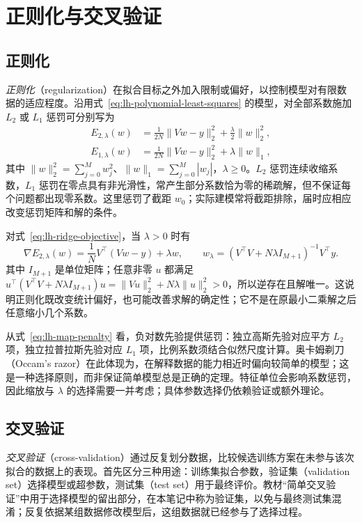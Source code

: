 \section{正则化与交叉验证}
\label{sec:lh-regularization-cv}

\subsection{正则化}
\label{subsec:lh-regularization}

\emph{正则化}（regularization）在拟合目标之外加入限制或偏好，以控制模型对有限数据的适应程度。沿用式~\eqref{eq:lh-polynomial-least-squares} 的模型，对全部系数施加 $L_2$ 或 $L_1$ 惩罚可分别写为
\begin{align}
    E_{2,\lambda}(w)
      &=\frac1{2N}\|Vw-y\|_2^2+\frac\lambda2\|w\|_2^2,
      \label{eq:lh-ridge-objective}\\
    E_{1,\lambda}(w)
      &=\frac1{2N}\|Vw-y\|_2^2+\lambda\|w\|_1,
      \label{eq:lh-lasso-objective}
\end{align}
其中 $\|w\|_2^2=\sum_{j=0}^M w_j^2$、$\|w\|_1=\sum_{j=0}^M|w_j|$，$\lambda\geq0$。$L_2$ 惩罚连续收缩系数，$L_1$ 惩罚在零点具有非光滑性，常产生部分系数恰为零的稀疏解，但不保证每个问题都出现零系数。这里惩罚了截距 $w_0$；实际建模常将截距排除，届时应相应改变惩罚矩阵和解的条件。

对式~\eqref{eq:lh-ridge-objective}，当 $\lambda>0$ 时有
\[
    \nabla E_{2,\lambda}(w)=\frac1N V^\top(Vw-y)+\lambda w,
    \qquad
    \widehat w_\lambda=(V^\top V+N\lambda I_{M+1})^{-1}V^\top y.
\]
其中 $I_{M+1}$ 是单位矩阵；任意非零 $u$ 都满足 $u^\top(V^\top V+N\lambda I_{M+1})u=\|Vu\|_2^2+N\lambda\|u\|_2^2>0$，所以逆存在且解唯一。这说明正则化既改变统计偏好，也可能改善求解的确定性；它不是在原最小二乘解之后任意缩小几个系数。

从式~\eqref{eq:lh-map-penalty} 看，负对数先验提供惩罚：独立高斯先验对应平方 $L_2$ 项，独立拉普拉斯先验对应 $L_1$ 项，比例系数须结合似然尺度计算。奥卡姆剃刀（Occam's razor）在此体现为，在解释数据的能力相近时偏向较简单的模型；这是一种选择原则，而非保证简单模型总是正确的定理。特征单位会影响系数惩罚，因此缩放与 $\lambda$ 的选择需要一并考虑；具体参数选择仍依赖验证或额外理论。

\subsection{交叉验证}
\label{subsec:lh-cross-validation}

\emph{交叉验证}（cross-validation）通过反复划分数据，比较候选训练方案在未参与该次拟合的数据上的表现。首先区分三种用途：训练集拟合参数，验证集（validation set）选择模型或超参数，测试集（test set）用于最终评价。教材“简单交叉验证”中用于选择模型的留出部分，在本笔记中称为验证集，以免与最终测试集混淆；反复依据某组数据修改模型后，这组数据就已经参与了选择过程。

